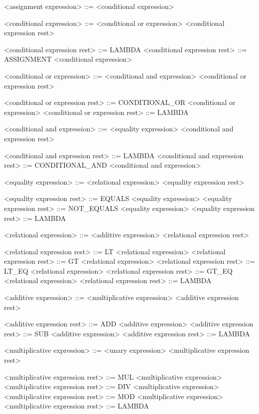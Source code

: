 <assignment expression>                   ::= <conditional expression>

<conditional expression>                  ::= <conditional or expression> <conditional expression rest>

<conditional expression rest>             ::= LAMBDA
<conditional expression rest>             ::= ASSIGNMENT <conditional expression>

<conditional or expression>               ::= <conditional and expression> <conditional or expression rest>

<conditional or expression rest>          ::= CONDITIONAL_OR <conditional or expression>
<conditional or expression rest>          ::= LAMBDA

<conditional and expression>              ::= <equality expression> <conditional and expression rest>

<conditional and expression rest>         ::= LAMBDA
<conditional and expression rest>         ::= CONDITIONAL_AND <conditional and expression>

<equality expression>                     ::= <relational expression> <equality expression rest>

<equality expression rest>                ::= EQUALS <equality expression>
<equality expression rest>                ::= NOT_EQUALS <equality expression>
<equality expression rest>                ::= LAMBDA

<relational expression>                   ::= <additive expression> <relational expression rest>

<relational expression rest>              ::= LT <relational expression>
<relational expression rest>              ::= GT <relational expression>
<relational expression rest>              ::= LT_EQ <relational expression>
<relational expression rest>              ::= GT_EQ <relational expression>
<relational expression rest>              ::= LAMBDA

<additive expression>                     ::= <multiplicative expression> <additive expression rest>

<additive expression rest>                ::= ADD <additive expression>
<additive expression rest>                ::= SUB <additive expression>
<additive expression rest>                ::= LAMBDA

<multiplicative expression>               ::= <unary expression> <multiplicative expression rest>

<multiplicative expression rest>          ::= MUL <multiplicative expression>
<multiplicative expression rest>          ::= DIV <multiplicative expression>
<multiplicative expression rest>          ::= MOD <multiplicative expression>
<multiplicative expression rest>          ::= LAMBDA

